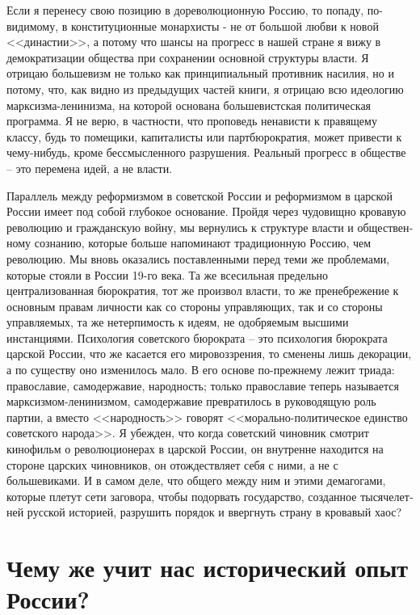 \documentclass{book}
\begin{document}
Если я перенесу свою позицию в дореволюционную Россию, то попаду, по-видимому, в конституционные монархисты - не от большой любви к новой <<династии>>, а потому что шансы на прогресс в нашей стране я вижу в демократизации общества при сохранении основной структуры власти. Я отрицаю больше­визм не только как принципиальный противник насилия, но и потому, что, как видно из предыдущих частей книги, я отрицаю всю идеологию марксизма-ленинизма, на которой основана большевистская политическая программа. Я не верю, в частно­сти, что проповедь ненависти к правящему классу, будь то поме­щики, капиталисты или партбюрократия, может привести к че­му-нибудь, кроме бессмысленного разрушения. Реальный про­гресс в обществе -- это перемена идей, а не власти.

Параллель между реформизмом в советской России и ре­формизмом в царской России имеет под собой глубокое осно­вание. Пройдя через чудовищно кровавую революцию и граж­данскую войну, мы вернулись к структуре власти и обществен­ному сознанию, которые больше напоминают традиционную Россию, чем революцию. Мы вновь оказались поставленными перед теми же проблемами, которые стояли в России 19-го ве­ка. Та же всесильная предельно централизованная бюрокра­тия, тот же произвол власти, то же пренебрежение к основным правам личности как со стороны управляющих, так и со сторо­ны управляемых, та же нетерпимость к идеям, не одобряемым высшими инстанциями. Психология советского бюрократа -- это психология бюрократа царской России, что же касается его мировоззрения, то сменены лишь декорации, а по сущест­ву оно изменилось мало. В его основе по-прежнему лежит три­ада: православие, самодержавие, народность; только правосла­вие теперь называется марксизмом-ленинизмом, самодержа­вие превратилось в руководящую роль партии, а вместо 
<<на­родность>> говорят <<морально-политическое единство совет­ского народа>>. Я убежден, что когда советский чиновник смот­рит кинофильм о революционерах в царской России, он внут­ренне находится на стороне царских чиновников, он отожде­ствляет себя с ними, а не с большевиками. И в самом деле, что общего между ним и этими демагогами, которые плетут сети заговора, чтобы подорвать государство, созданное тысячелет­ней русской историей, разрушить порядок и ввергнуть страну в кровавый хаос?


\section{Чему же учит нас исторический опыт России?}
\end{document}
